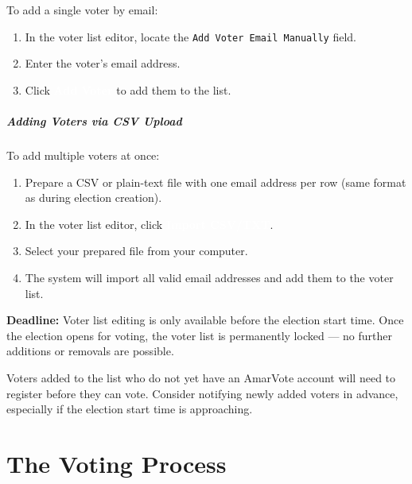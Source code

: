 \documentclass[12pt,a4paper,openany]{book}
\newcommand{\uibutton}[1]{\colorbox{primaryblue}{\textcolor{white}{\small\textbf{#1}}}}
\newcommand{\uifield}[1]{\texttt{\color{accentteal}#1}}
\begin{document}
To add a single voter by email:

\begin{enumerate}
	\item In the voter list editor, locate the \uifield{Add Voter Email Manually} field.
	\item Enter the voter's email address.
	\item Click \uibutton{Add Voter} to add them to the list.
\end{enumerate}

\subsubsection{Adding Voters via CSV Upload}

To add multiple voters at once:

\begin{enumerate}
	\item Prepare a CSV or plain-text file with one email address per row (same format as during election creation).
	\item In the voter list editor, click \uibutton{Import CSV/TXT}.
	\item Select your prepared file from your computer.
	\item The system will import all valid email addresses and add them to the voter list.
\end{enumerate}

\begin{tcolorbox}[warnbox]
	\textbf{Deadline:} Voter list editing is only available before the election start time. Once the election opens for voting, the voter list is permanently locked --- no further additions or removals are possible.
\end{tcolorbox}

\begin{tcolorbox}[tipbox]
	Voters added to the list who do not yet have an AmarVote account will need to register before they can vote. Consider notifying newly added voters in advance, especially if the election start time is approaching.
\end{tcolorbox}

\part{The Voting Process}

\end{document}
